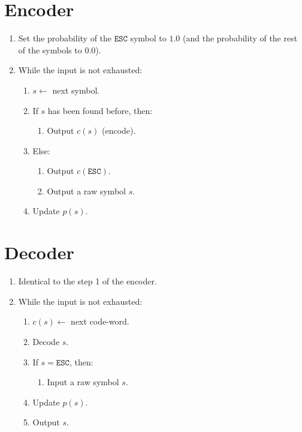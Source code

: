 \section{Encoder}
\begin{enumerate}
\item Set the probability of the $\mathtt{ESC}$ symbol to $1.0$ (and the probability of
  the rest of the symbols to $0.0$).
\item While the input is not exhausted:
  \begin{enumerate}
  \item $s\leftarrow$ next symbol.
  \item If $s$ has been found before, then:
    \begin{enumerate}
    \item Output $c(s)$ (encode).
    \end{enumerate}
  \item Else:
    \begin{enumerate}
    \item Output $c(\mathtt{ESC})$.
    \item Output a raw symbol $s$.
    \end{enumerate}
  \item Update $p(s)$.
  \end{enumerate}
\end{enumerate}

\section{Decoder}
\begin{enumerate}
\item Identical to the step 1 of the encoder.
\item While the input is not exhausted:
  \begin{enumerate}
  \item $c(s)\leftarrow $ next code-word.
  \item Decode $s$.
  \item If $s=\mathtt{ESC}$, then:
    \begin{enumerate}
    \item Input a raw symbol $s$.
    \end{enumerate}
  \item Update $p(s)$.
  \item Output $s$.
  \end{enumerate}
\end{enumerate}

